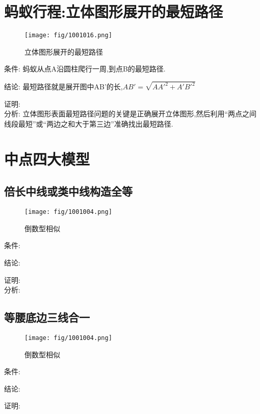 \documentclass[cn,blue,10pt]{elegantbook}
\begin{document}
\section{蚂蚁行程:立体图形展开的最短路径}%
\label{sec:蚂蚁行程}

\begin{figure}[h]
    \centering
    \texttt{[image: fig/1001016.png]}
    \caption{立体图形展开的最短路径}%
    \label{fig:倒数型相似}
\end{figure}
条件: 蚂蚁从点A沿圆柱爬行一周,到点B的最短路径.

结论: 最短路径就是展开图中AB'的长,\(AB'=\sqrt{ AA'^2 + A'B'^2 }\) 

证明:\\

分析: 立体图形表面最短路径问题的关键是正确展开立体图形,然后利用``两点之间线段最短''或``两边之和大于第三边''准确找出最短路径.

\section{中点四大模型}%
\label{sec:中点四大模型}

\subsection{倍长中线或类中线构造全等}%
\label{sub:倍长中线或类中线构造全等}

\begin{figure}[h]
    \centering
    \texttt{[image: fig/1001004.png]}
    \caption{倒数型相似}%
    \label{fig:倒数型相似}
\end{figure}
条件: \(\) 

结论: \( \) 

证明:\\

分析: 
\subsection{等腰底边三线合一}%
\label{sub:等腰底边三线合一}

\begin{figure}[h]
    \centering
    \texttt{[image: fig/1001004.png]}
    \caption{倒数型相似}%
    \label{fig:倒数型相似}
\end{figure}
条件: \(\) 

结论: \( \) 

证明:\\
\end{document}
